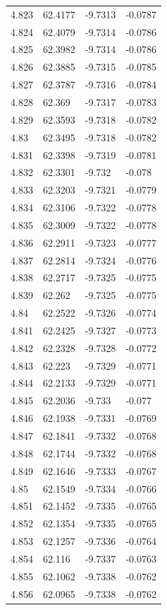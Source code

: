 \begin{tabular}{llll}
4.823 & 62.4177 & -9.7313 & -0.0787 \\
4.824 & 62.4079 & -9.7314 & -0.0786 \\
4.825 & 62.3982 & -9.7314 & -0.0786 \\
4.826 & 62.3885 & -9.7315 & -0.0785 \\
4.827 & 62.3787 & -9.7316 & -0.0784 \\
4.828 & 62.369 & -9.7317 & -0.0783 \\
4.829 & 62.3593 & -9.7318 & -0.0782 \\
4.83 & 62.3495 & -9.7318 & -0.0782 \\
4.831 & 62.3398 & -9.7319 & -0.0781 \\
4.832 & 62.3301 & -9.732 & -0.078 \\
4.833 & 62.3203 & -9.7321 & -0.0779 \\
4.834 & 62.3106 & -9.7322 & -0.0778 \\
4.835 & 62.3009 & -9.7322 & -0.0778 \\
4.836 & 62.2911 & -9.7323 & -0.0777 \\
4.837 & 62.2814 & -9.7324 & -0.0776 \\
4.838 & 62.2717 & -9.7325 & -0.0775 \\
4.839 & 62.262 & -9.7325 & -0.0775 \\
4.84 & 62.2522 & -9.7326 & -0.0774 \\
4.841 & 62.2425 & -9.7327 & -0.0773 \\
4.842 & 62.2328 & -9.7328 & -0.0772 \\
4.843 & 62.223 & -9.7329 & -0.0771 \\
4.844 & 62.2133 & -9.7329 & -0.0771 \\
4.845 & 62.2036 & -9.733 & -0.077 \\
4.846 & 62.1938 & -9.7331 & -0.0769 \\
4.847 & 62.1841 & -9.7332 & -0.0768 \\
4.848 & 62.1744 & -9.7332 & -0.0768 \\
4.849 & 62.1646 & -9.7333 & -0.0767 \\
4.85 & 62.1549 & -9.7334 & -0.0766 \\
4.851 & 62.1452 & -9.7335 & -0.0765 \\
4.852 & 62.1354 & -9.7335 & -0.0765 \\
4.853 & 62.1257 & -9.7336 & -0.0764 \\
4.854 & 62.116 & -9.7337 & -0.0763 \\
4.855 & 62.1062 & -9.7338 & -0.0762 \\
4.856 & 62.0965 & -9.7338 & -0.0762 \\

\end{tabular}

